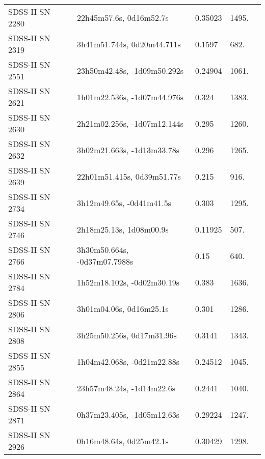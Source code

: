 \begin{longtable}{lllll}
  SDSS-II SN 2280 &        22h45m57.6s, 0d16m52.7s &  0.35023 &          1495. &    \citet{2016SDSSD.C...0000:} \\
  SDSS-II SN 2319 &     3h41m51.744s, 0d20m44.711s &   0.1597 &           682. &    \citet{2011ApJ...738..162S} \\
  SDSS-II SN 2551 &    23h50m42.48s, -1d09m50.292s &  0.24904 &          1061. &    \citet{2016SDSSD.C...0000:} \\
  SDSS-II SN 2621 &    1h01m22.536s, -1d07m44.976s &    0.324 &          1383. &    \citet{2011ApJ...738..162S} \\
  SDSS-II SN 2630 &    2h21m02.256s, -1d07m12.144s &    0.295 &          1260. &    \citet{2011ApJ...738..162S} \\
  SDSS-II SN 2632 &     3h02m21.663s, -1d13m33.78s &    0.296 &          1265. &    \citet{2011ApJ...738..162S} \\
  SDSS-II SN 2639 &     22h01m51.415s, 0d39m51.77s &    0.215 &           916. &    \citet{2011ApJ...738..162S} \\
  SDSS-II SN 2734 &       3h12m49.65s, -0d41m41.5s &    0.303 &          1295. &    \citet{2010ApJ...713.1026D} \\
  SDSS-II SN 2746 &        2h18m25.13s, 1d08m00.9s &  0.11925 &           507. &    \citet{2016SDSSD.C...0000:} \\
  SDSS-II SN 2766 &   3h30m50.664s, -0d37m07.7988s &     0.15 &           640. &    \citet{2003SDSS1.C...0000:} \\
  SDSS-II SN 2784 &     1h52m18.102s, -0d02m30.19s &    0.383 &          1636. &    \citet{2011ApJ...738..162S} \\
  SDSS-II SN 2806 &        3h01m04.06s, 0d16m25.1s &    0.301 &          1286. &    \citet{2010ApJ...713.1026D} \\
  SDSS-II SN 2808 &      3h25m50.256s, 0d17m31.96s &   0.3141 &          1343. &    \citet{2011ApJ...738..162S} \\
  SDSS-II SN 2855 &     1h04m42.068s, -0d21m22.88s &  0.24512 &          1045. &    \citet{2016SDSSD.C...0000:} \\
  SDSS-II SN 2864 &      23h57m48.24s, -1d14m22.6s &   0.2441 &          1040. &    \citet{2011ApJ...738..162S} \\
  SDSS-II SN 2871 &     0h37m23.405s, -1d05m12.63s &  0.29224 &          1247. &    \citet{2016SDSSD.C...0000:} \\
  SDSS-II SN 2926 &        0h16m48.64s, 0d25m42.1s &  0.30429 &          1298. &    \citet{2013ApJ...763...88C} \\

\end{longtable}
